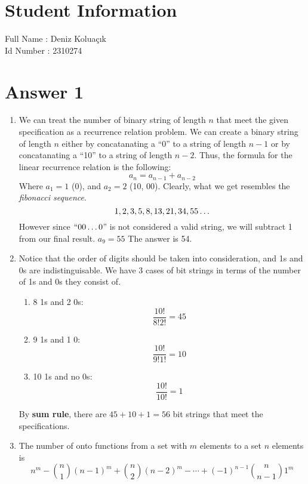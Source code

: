 \documentclass[12pt]{article}
\begin{document}
\section*{Student Information } 
Full Name : Deniz Koluaçık \\
Id Number : 2310274 \\

\section*{Answer 1}
\begin{enumerate}[label=\alph*)]
	\item
		We can treat the number of binary string of length $n$ that meet the given specification as a recurrence relation problem. We can create a binary string of length $n$ either by concatanating a ``0'' to a string of length $n-1$ or by concatanating a ``10'' to a string of length $n-2$. Thus, the formula for the linear recurrence relation is the following: \[a_n = a_{n-1} + a_{n-2}\]
		Where $a_1 = 1$ (0), and $a_2 = 2$ (10, 00). Clearly, what we get resembles the \textit{fibonacci sequence}. \[1,2,3,5,8,13,21,34,55\mathellipsis\] However since $``00\ldots0$'' is not considered a valid string, we will subtract 1 from our final result.  $a_9 = 55$ The answer is 54.
	\item
		Notice that the order of digits should be taken into consideration, and 1s and 0s are indistinguisable. We have 3 cases of bit strings in terms of the number of 1s and 0s they consist of.
		\begin{enumerate}[label=\roman*)]
			\item{} 8 1s and 2 0s:\\
				\[\dfrac{10!}{8!2!} = 45\]
			\item{} 9 1s and 1 0:\\
				\[\dfrac{10!}{9!1!} = 10\]
			\item{} 10 1s and no 0s:\\
				\[\dfrac{10!}{10!} = 1\]
		\end{enumerate}
		By \textbf{sum rule}, there are $45 + 10 + 1 = 56$ bit strings that meet the specifications.\\
	\item
		The number of onto functions from a set with $m$ elements to a set $n$ elements is \[n^m - \binom{n}{1}(n-1)^m + \binom{n}{2}(n-2)^m-\cdots+(-1)^{n-1}\binom{n}{n-1}1^m\]

\end{enumerate}
\end{document}
